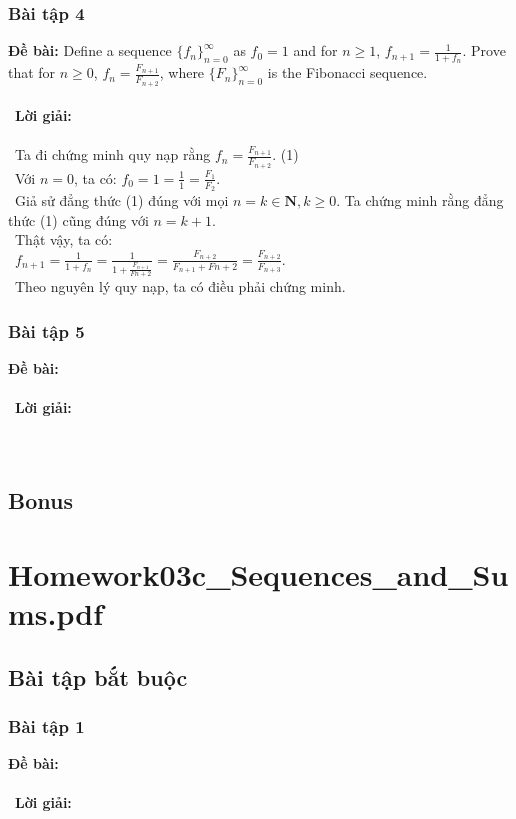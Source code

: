 \documentclass[a4paper]{article}
\begin{document}
\subsubsection{Bài tập 4}
\textbf{Đề bài: }Define a sequence $\{f_n\}_{n=0}^\infty$ as $f_0 = 1$ and for $n \geq 1$, $f_{n+1} = \frac{1}{1+f_n}$. Prove that for $n \geq 0$, $f_n = \frac{F_{n+1}}{F_{n+2}}$, where $\{F_n\}_{n=0}^\infty$ is the Fibonacci sequence. \\\ \\\
\textbf{Lời giải: } \\\ \\\
Ta đi chứng minh quy nạp rằng $f_n = \frac{F_{n+1}}{F_{n+2}}$. (1)\\\
Với $n = 0$, ta có: $f_0 = 1 = \frac{1}{1} = \frac{F_1}{F_2}$. \\\
Giả sử đẳng thức (1) đúng với mọi $n = k \in \textbf{N}, k \geq 0$.
Ta chứng minh rằng đẳng thức (1) cũng đúng với $n = k+1$.\\\
Thật vậy, ta có: \\\
$f_{n+1} = \frac{1}{1+f_n} = \frac{1}{1+\frac{F_{n+1}}{F{n+2}}} = \frac{F_{n+2}}{F_{n+1} + F{n+2}} = \frac{F_{n+2}}{F_{n+3}}$. \\\
Theo nguyên lý quy nạp, ta có điều phải chứng minh.
\clearpage
\subsubsection{Bài tập 5}
\textbf{Đề bài:} 
\\\ \\\
\textbf{Lời giải:} \\\ \\\
\clearpage

\subsection{Bonus}
\clearpage

\section{Homework03c\_Sequences\_and\_Sums.pdf}
\subsection{Bài tập bắt buộc}
\subsubsection{Bài tập 1}
\textbf{Đề bài:} 
\\\ \\\
\textbf{Lời giải:} \\\ \\\
\clearpage
\end{document}

